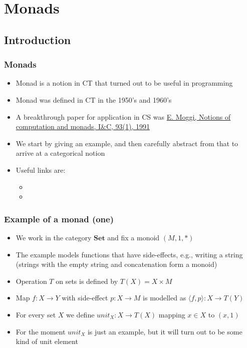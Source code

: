 \documentclass[handout]{beamer}
\title[INF223 presentations]{}
\newcommand{\bfsf}[1]{{\boldsymbol{#1}}}
\newcommand{\Set}{\bfsf{Set}}
\newcommand{\Kp}[1]{{\langle #1 \rangle}}
\begin{document}
\section{Monads}
\subsection{Introduction}
 
\frame
  {   
    \frametitle{Monads}\label{Mon5:Intro}

 \begin{itemize}[<+->]
\item Monad is a notion in CT that turned out to be useful in programming
\item Monad was defined in CT in the 1950's and 1960's
\item A breakthrough paper for application in CS was 
\href{https://person.dibris.unige.it/moggi-eugenio/ftp/ic91.pdf}{\color{blue}E. Moggi, Notions of computation and monads, I\&C, 93(1), 1991}
\item We start by giving an example, and then carefully abstract from that
to arrive at a categorical notion
\item Useful links are:
 \begin{itemize}
    \item {}
    \item {}
 \end{itemize}
 \end{itemize}

 }

\frame
  {   
    \frametitle{Example of a monad (one)}\label{Mon5:ExaSetMone}

 \begin{itemize}[<+->]
\item We work in the category $\Set$ and fix a monoid $(M,1,*)$
\item The example models functions that have side-effects, e.g., writing a
string (strings with the empty string and concatenation form a monoid)
\item Operation $T$ on sets is defined by $T(X)= X\times M$
\item Map $f : X\to Y$ with side-effect $p : X\to M$ is modelled as $\Kp{f,p} : X\to T(Y)$
\item For every set $X$ we define $unit_X: X\to T(X)$ mapping $x\in X$ to $(x,1)$
\item For the moment $unit_X$ is just an example, but it will turn out to
be some kind of unit element
 \end{itemize}
 }
\end{document}
